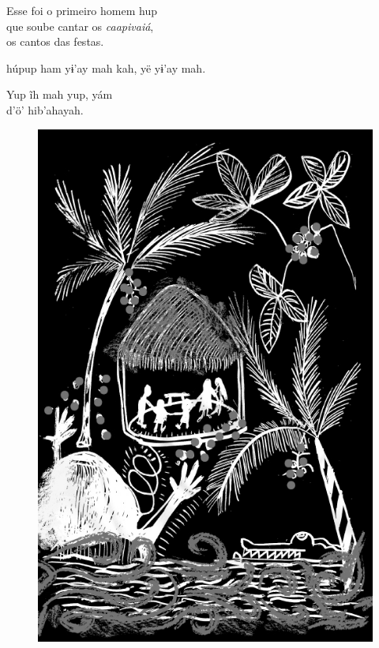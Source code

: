 Esse foi o primeiro homem hup\\
que soube cantar os \textit{caapivaiá},\\
os cantos das festas.

\vspace{2em}

 húpup ham
yɨ’ay mah kah, yë
yɨ’ay mah.

\medskip

Yup ĩh mah yup, yám\\
d’ö’ hib’ahayah.

\vspace*{\fill}

\begin{figure}
\vspace*{-1.5cm}
\hspace*{-2.4cm}\includegraphics[width=142mm]{./imgs/img8.jpg}
\end{figure}

